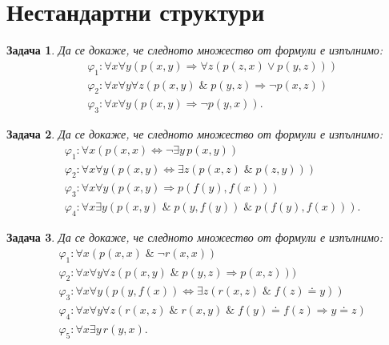 \documentclass[12pt]{article}
\newtheorem{problem}{Задача}[section]
\theoremstyle{definition}
\theoremstyle{remark}
\begin{document}
\newpage

\section{Нестандартни структури}

\begin{problem}
Да се докаже, че следното множество от формули е изпълнимо:
\begin{align*}
       & \varphi_1 : \forall x \forall y (p(x, y) \Rightarrow \forall z (p(z, x) \lor p(y, z)))        \\
       & \varphi_2 : \forall x \forall y \forall z (p(x, y) \; \& \; p(y, z) \Rightarrow \neg p(x, z)) \\
       & \varphi_3 : \forall x \forall y (p(x, y) \Rightarrow \neg p(y, x)).
\end{align*}
\end{problem}

\begin{problem}
Да се докаже, че следното множество от формули е изпълнимо:
\begin{align*}
       & \varphi_1 : \forall x (p(x, x) \Leftrightarrow \neg \exists y \, p(x, y))                      \\
       & \varphi_2 : \forall x \forall y (p(x, y) \Leftrightarrow \exists z (p(x, z) \; \& \; p(z, y))) \\
       & \varphi_3 : \forall x \forall y (p(x, y) \Rightarrow p(f(y), f(x)))                            \\
       & \varphi_4 : \forall x \exists y (p(x, y) \; \& \; p(y, f(y)) \; \& \; p(f(y), f(x))).
\end{align*}
\end{problem}

\begin{problem}
Да се докаже, че следното множество от формули е изпълнимо:
\begin{align*}
       & \varphi_1 : \forall x (p(x, x) \; \& \; \neg r(x, x))                                                                   \\
       & \varphi_2 : \forall x \forall y \forall z (p(x, y) \; \& \; p(y, z) \Rightarrow p(x, z)))                               \\
       & \varphi_3 : \forall x \forall y (p(y, f (x)) \Leftrightarrow \exists z (r(x, z) \; \& \; f (z) \doteq y))               \\
       & \varphi_4 : \forall x \forall y \forall z (r(x, z) \; \& \; r(x, y) \; \& \; f (y) \doteq f (z) \Rightarrow y \doteq z) \\
       & \varphi_5 : \forall x \exists y \, r(y, x).
\end{align*}
\end{problem}
\end{document}
